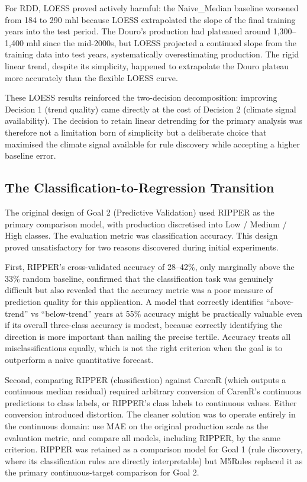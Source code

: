 For RDD, LOESS proved actively harmful: the Naive\_Median baseline worsened from 184 to 290 mhl because LOESS extrapolated the slope of the final training years into the test period. The Douro's production had plateaued around 1,300--1,400 mhl since the mid-2000s, but LOESS projected a continued slope from the training data into test years, systematically overestimating production. The rigid linear trend, despite its simplicity, happened to extrapolate the Douro plateau more accurately than the flexible LOESS curve.

These LOESS results reinforced the two-decision decomposition: improving Decision 1 (trend quality) came directly at the cost of Decision 2 (climate signal availability). The decision to retain linear detrending for the primary analysis was therefore not a limitation born of simplicity but a deliberate choice that maximised the climate signal available for rule discovery while accepting a higher baseline error.


\subsection{The Classification-to-Regression Transition}\label{sub:the_classificationtoregression_transition}

The original design of Goal 2 (Predictive Validation) used RIPPER as the primary comparison model, with production discretised into Low / Medium / High classes. The evaluation metric was classification accuracy. This design proved unsatisfactory for two reasons discovered during initial experiments.

First, RIPPER's cross-validated accuracy of 28--42\%, only marginally above the 33\% random baseline, confirmed that the classification task was genuinely difficult but also revealed that the accuracy metric was a poor measure of prediction quality for this application. A model that correctly identifies ``above-trend'' vs ``below-trend'' years at 55\% accuracy might be practically valuable even if its overall three-class accuracy is modest, because correctly identifying the direction is more important than nailing the precise tertile. Accuracy treats all misclassifications equally, which is not the right criterion when the goal is to outperform a naive quantitative forecast.

Second, comparing RIPPER (classification) against CarenR (which outputs a continuous median residual) required arbitrary conversion of CarenR's continuous predictions to class labels, or RIPPER's class labels to continuous values. Either conversion introduced distortion. The cleaner solution was to operate entirely in the continuous domain: use MAE on the original production scale as the evaluation metric, and compare all models, including RIPPER, by the same criterion. RIPPER was retained as a comparison model for Goal 1 (rule discovery, where its classification rules are directly interpretable) but M5Rules replaced it as the primary continuous-target comparison for Goal 2.

